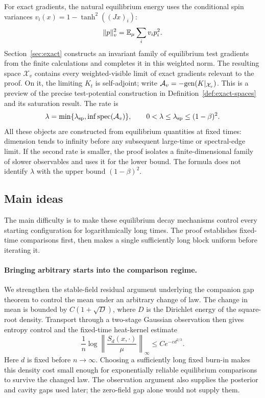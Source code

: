 For exact gradients, the natural equilibrium energy uses the conditional
spin variances \(v_i(x)=1-\tanh^2((Jx)_i)\):
\[
 \|p\|_v^2=\mathbb E_\mu\sum_i v_i p_i^2.
\]
Section~\ref{sec:exact} constructs an invariant family of equilibrium
test gradients from the finite calculations and completes it in this
weighted norm. The resulting space \(\mathcal X_v\) contains every
weighted-visible limit of exact gradients relevant to the proof.
On it, the limiting \(K_t\) is self-adjoint; write
\(\mathcal A_v=-{\rm gen}(K|_{\mathcal X_v})\). This is a preview
of the precise test-potential construction in
Definition~\ref{def:exact-spaces} and its saturation result. The rate is
\[
 \lambda=\min\{\lambda_{\rm sp},\inf\operatorname{spec}(\mathcal A_v)\},
 \qquad
 0<\lambda\le\lambda_{\rm sp}\le(1-\beta)^2.
\]
All these objects are constructed from equilibrium quantities at fixed
times: dimension tends to infinity before any subsequent large-time or
spectral-edge limit. If the second rate is smaller, the proof isolates a
finite-dimensional family of slower observables and uses it for the
lower bound. The formula does not identify \(\lambda\) with the upper
bound \((1-\beta)^2\).

\subsection{Main ideas}

The main difficulty is to make these equilibrium decay mechanisms
control every starting configuration for logarithmically long times.
The proof establishes fixed-time comparisons first, then makes a single
sufficiently long block uniform before iterating it.

\paragraph{Bringing arbitrary starts into the comparison regime.}
We strengthen the stable-field residual argument underlying the companion
gap theorem to control the mean under an arbitrary change of law. The
change in mean is bounded by \(C(1+\sqrt D)\), where \(D\) is the
Dirichlet energy of the square-root density. Transport through a two-stage Gaussian observation
then gives entropy control and the fixed-time heat-kernel estimate
\[
 \frac1n\log\left\|\frac{S_d(x,\cdot)}{\mu}\right\|_\infty
 \le C e^{-c d^{2/3}}.
\]
Here \(d\) is fixed before \(n\to\infty\). Choosing a sufficiently
long fixed burn-in makes this density cost small enough for exponentially
reliable equilibrium comparisons to survive the changed law. The
observation argument also supplies the posterior and cavity gaps used
later; the zero-field gap alone would not supply them.

